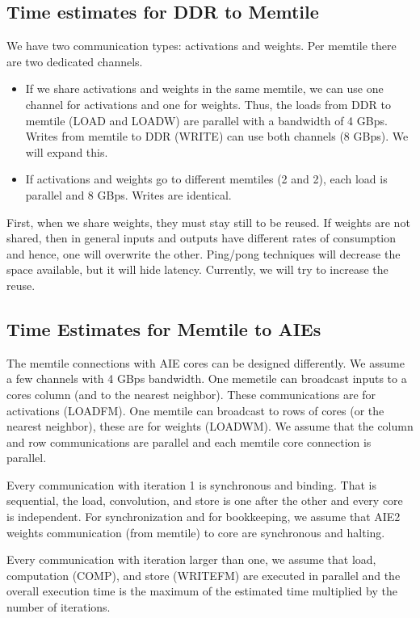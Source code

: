 \documentclass[conference]{IEEEtran}
\begin{document}
\subsection{Time estimates for DDR to Memtile}
We have two communication types: activations and weights. Per
memtile there are two dedicated channels.
\begin{itemize}
 \item If we share activations and weights in the same memtile, we
   can use one channel for activations and one for weights. Thus, the
   loads from DDR to memtile (LOAD and LOADW) are parallel with a
   bandwidth of 4 GBps. Writes from memtile to DDR (WRITE) can use
   both channels (8 GBps). We will expand this.

 \item If activations and weights go to different memtiles (2 and 2),
   each load is parallel and 8 GBps. Writes
   are identical.
\end{itemize}


First, when we share weights, they must stay still to be reused. If
weights are not shared, then in general inputs and outputs have
different rates of consumption and hence, one will overwrite the
other. Ping/pong techniques will decrease the space available, but it
will hide latency. Currently, we will try to increase the reuse.

   
\subsection{Time Estimates for Memtile to AIEs}

The memtile connections with AIE cores can be designed differently. We
assume a few channels with 4 GBps bandwidth. One memetile
can broadcast inputs to a cores column (and to the nearest
neighbor). These communications are for activations (LOADFM). One
memtile can broadcast to rows of cores (or the nearest neighbor),
these are for weights (LOADWM). We assume that the column and row
communications are parallel and each memtile core connection is
parallel.

Every communication with iteration 1 is synchronous and binding. That
is sequential, the load, convolution, and store is one after the other
and every core is independent.  For synchronization and for
bookkeeping, we assume that AIE2 weights communication (from memtile)
to core are synchronous and halting.

Every communication with iteration larger than one, we assume that
load, computation (COMP), and store (WRITEFM) are executed in parallel
and the overall execution time is the maximum of the estimated time
multiplied by the number of iterations.
\end{document}
